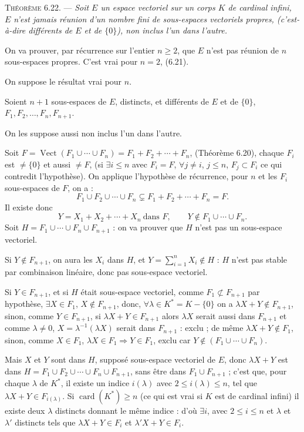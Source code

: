 \medskip\noindent\textsc{Théorème 6.22.} --- \emph{Soit $E$ un espace vectoriel sur un corps $K$ de cardinal infini, $E$ n'est jamais réunion d'un nombre fini de sous-espaces vectoriels propres, (c'est-à-dire différents de $E$ et de $\{0\}$), non inclus l'un dans l'autre.}

On va prouver, par récurrence sur l'entier $n\ge2$, que $E$ n'est pas réunion de $n$ sous-espaces propres. C'est vrai pour $n=2$, (6.21).

On suppose le résultat vrai pour $n$.

Soient $n+1$ sous-espaces de $E$, distincts, et différents de $E$ et de $\{0\}$, $F_1,F_2,\ldots,F_n,F_{n+1}$.

On les suppose aussi non inclus l'un dans l'autre.

Soit $F=\operatorname{Vect}(F_1\cup\cdots\cup F_n)=F_1+F_2+\cdots+F_n$, (Théorème 6.20), chaque $F_i$ est $\ne\{0\}$ et aussi $\ne F$, (si $\exists i\le n$ avec $F_i=F$, $\forall j\ne i$, $j\le n$, $F_j\subset F_i$ ce qui contredit l'hypothèse). On applique l'hypothèse de récurrence, pour $n$ et les $F_i$ sous-espaces de $F$, on a :
\[
F_1\cup F_2\cup\cdots\cup F_n\subsetneq F_1+F_2+\cdots+F_n=F.
\]
Il existe donc
\[
Y=X_1+X_2+\cdots+X_n\ \text{dans }F,\qquad Y\notin F_1\cup\cdots\cup F_n.
\]
Soit $H=F_1\cup\cdots\cup F_n\cup F_{n+1}$ : on va prouver que $H$ n'est pas un sous-espace vectoriel.

Si $Y\notin F_{n+1}$, on aura les $X_i$ dans $H$, et $Y=\sum_{i=1}^nX_i\notin H$ : $H$ n'est pas stable par combinaison linéaire, donc pas sous-espace vectoriel.

Si $Y\in F_{n+1}$, et si $H$ était sous-espace vectoriel, comme $F_1\not\subset F_{n+1}$ par hypothèse, $\exists X\in F_1$, $X\notin F_{n+1}$, donc, $\forall\lambda\in K^*=K-\{0\}$ on a $\lambda X+Y\notin F_{n+1}$, sinon, comme $Y\in F_{n+1}$, si $\lambda X+Y\in F_{n+1}$ alors $\lambda X$ serait aussi dans $F_{n+1}$ et comme $\lambda\ne0$, $X=\lambda^{-1}(\lambda X)$ serait dans $F_{n+1}$ : exclu ; de même $\lambda X+Y\notin F_1$, sinon, comme $X\in F_1$, $\lambda X\in F_1\Rightarrow Y\in F_1$, exclu car $Y\notin(F_1\cup\cdots\cup F_n)$.

Mais $X$ et $Y$ sont dans $H$, supposé sous-espace vectoriel de $E$, donc $\lambda X+Y$ est dans $H=F_1\cup F_2\cup\cdots\cup F_n\cup F_{n+1}$, sans être dans $F_1\cup F_{n+1}$ ; c'est que, pour chaque $\lambda$ de $K^*$, il existe un indice $i(\lambda)$ avec $2\le i(\lambda)\le n$, tel que $\lambda X+Y\in F_{i(\lambda)}$. Si $\operatorname{card}(K^*)\ge n$ (ce qui est vrai si $K$ est de cardinal infini) il existe deux $\lambda$ distincts donnant le même indice : d'où $\exists i$, avec $2\le i\le n$ et $\lambda$ et $\lambda'$ distincts tels que $\lambda X+Y\in F_i$ et $\lambda'X+Y\in F_i$.

